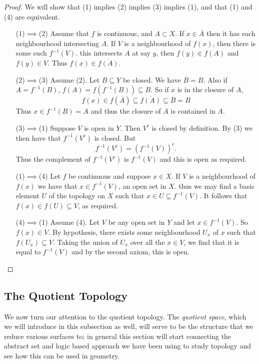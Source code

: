 \begin{proof}
  We will show that (1) implies (2) implies (3) implies (1), and that
  (1) and (4) are equivalent.

  \begin{itemize}
  \item[(1)$\implies$(2)] Assume that $f$ is continuous, and $A
    \subset X$. If $x \in \overline{A}$ then it has each neighbourhood
    intersecting $A$. If $V$ is a neighbourhood of $f(x)$, then there
    is some such $f^{-1}(V)$. this intersects $A$ at say $y$, then
    $f(y) \in f(A)$ and $f(y) \in V$. Thus $f(x) \in
    \overline{f(A)}$. 
  \item[(2)$\implies$(3)] Assume (2). Let $B \subseteq Y$ be
    closed. We have $\overline{B} = B$. Also if $A = f^{-1}(B)$, $f(A)
    = f(f^{-1}(B)) \subseteq B$. So if $x$ is in the closure of $A$, 
    \[
      f(x) \in f(\overline{A}) \subseteq \overline{f(A)} \subseteq
      \overline{B} = B 
    \]
    Thus $x \in f^{-1}(B) = A$ and thus the closure of $A$ is
    contained in $A$.
  \item[(3)$\implies$(1)] Suppose $V$ is open in $Y$. Then $V^c$ is
    closed by definition. By (3) we then have that $f^{-1}(V^c)$ is
    closed. But
    \[
      f^{-1}(V^c) = (f^{-1}(V))^c.
    \]
    Thus the complement of $f^{-1}(V^c)$ is $f^{-1}(V)$ and
    this is open as required.
  \item[(1)$\implies$(4)] Let $f$ be continuous and suppose $x \in
    X$. If $V$ is a neighbourhood of $f(x)$ we have that  $x \in
    f^{-1}(V)$, an open set in $X$. thus we may find a basis element
    $U$ of the topology on $X$ such that $x \in U \subseteq
    f^{-1}(V)$. It follows that $f(x) \in f(U) \subseteq V$, as
    required.
  \item[(4)$\implies$(1)] Assume (4). Let $V$ be any open set in
    $Y$ and let $x \in f^{-1}(V)$. So $f(x) \in V$. By hypothesis,
    there exists some neighbourhood $U_x$ of $x$ such that $f(U_x)
    \subseteq V$. Taking the union of $U_x$ over all the $x \in V$, we
    find that it is equal to $f^{-1}(V)$ and by the second axiom, this
    is open.
  \end{itemize}  
\end{proof}

\subsection{The Quotient Topology}
\label{sec:prelims:quotient}

We now turn our attention to the quotient topology. The \emph{quotient
  space}, which we will introduce in this subsection as well, will
serve to be the structure that we reduce various surfaces to; in
general this section will start connecting the abstract set and logic
based approach we have been using to study topology and see how this
can be used in geometry.

